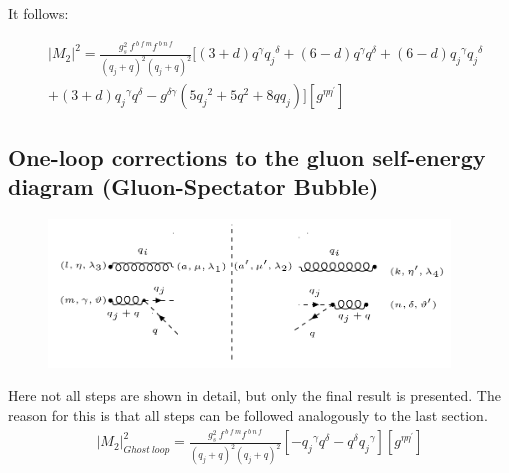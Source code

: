 It follows:

\begin{equation}
\begin{split}
&|M_2|^2=\frac{g_s^2\: f^{\:b\:f\:m} f^{\:b\:n\:f}}{(q_j +q)^2 (q_j +q)^2}[(3+d)q^{\gamma}{q_j}^{\delta}+(6-d)q^{\gamma}{q}^{\delta}+(6-d){q_j}^{\gamma}{q_j}^{\delta}\\
&+(3+d){q_j}^{\gamma}{q}^{\delta}-g^{{\delta}{\gamma}}(5{q_j}^2+5q^2+8qq_j)][g^{{\eta}{{\eta}^{\prime}}}]
\end{split}
\end{equation}





\pagebreak
\subsection{One-loop corrections to the gluon self-energy diagram (Gluon-Spectator Bubble)}
\begin{figure}[h!]
\centering
\includegraphics[width=0.95\textwidth]{images/GG/GhostM2.png}
\end{figure}
Here not all steps are shown in detail, but only the final result is presented. The reason for this is that all steps can be followed analogously to the last section.
\begin{equation}
\begin{split}
{{|M_2|}^2_{Ghost \:loop}}=\frac{g_s^2 \:f^{\:b\:f\:m} f^{\:b\:n\:f}}{(q_j +q)^2 (q_j +q)^2} [-{q_j}^{{\gamma}}{q}^{{\delta}}-{q}^{{\delta}}{q_j}^{{\gamma}}][g^{{\eta}{{\eta}^{\prime}}}]
\end{split}
\end{equation}

